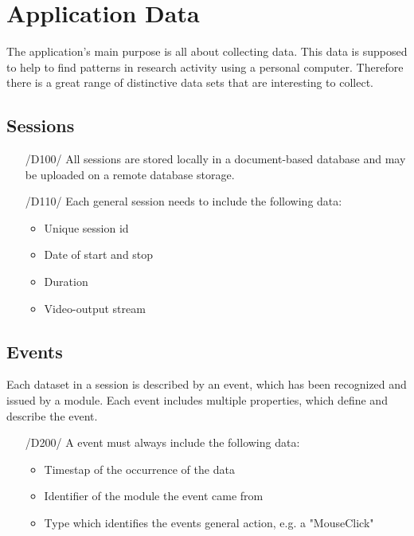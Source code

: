 \chapter{Application Data}
\label{ch:data}

The application's main purpose is all about collecting data. This data is supposed to help to find patterns in research activity using a personal computer. Therefore there is a great range of distinctive data sets that are interesting to collect.

\section{Sessions}
\begin{itemize}

\item[/D100/] All sessions are stored locally in a document-based database and may be uploaded on a remote database storage.

\item[/D110/] Each general session needs to include the following data:
	\begin{itemize}
	\item Unique session id
	\item Date of start and stop
	\item Duration
	\item Video-output stream
	\end{itemize}
\end{itemize}

\section{Events}

Each dataset in a session is described by an event, which has been recognized and issued by a module. Each event includes multiple properties, which define and describe the event.

\begin{itemize}
\item[/D200/] A event must always include the following data:
	\begin{itemize}
	\item Timestap of the occurrence of the data
	\item Identifier of the module the event came from
	\item Type which identifies the events general action, e.g. a "MouseClick"
	\end{itemize}
\end{itemize}

